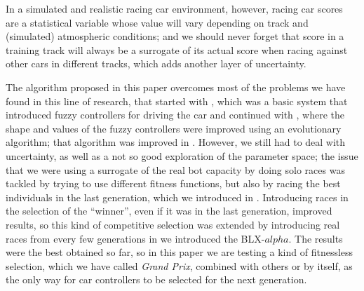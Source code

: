 \documentclass[10pt,journal,compsoc]{IEEEtran}
\begin{document}
\IEEEdisplaynontitleabstractindextext
\IEEEpeerreviewmaketitle





In a simulated and
    realistic racing car environment, however, racing car scores are a
    statistical variable whose value will vary depending on track and
    (simulated) atmospheric conditions; and we should never forget
    that score in a training track will always be a surrogate of its
    actual score when racing against other cars in different tracks,
    which adds another layer of uncertainty.




The algorithm proposed in this paper overcomes most of the problems we
have found in this line of research, that started with
\cite{DBLP:conf/evoW/SalemMMG17}, which was a basic system that
introduced fuzzy controllers for driving the car and continued with
\cite{10.1007/978-3-319-77538-8_24}, where the shape and values of the
fuzzy controllers were improved using an evolutionary algorithm; that
algorithm was improved in \cite{DBLP:conf/ipmu/SalemMGG18}. However,
we still had to deal with uncertainty, as well as a not so good
exploration of the parameter space; the issue that we were using a
surrogate of the real bot capacity by doing solo races was tackled by
trying to use different fitness functions, but also by racing the best
individuals in the last generation, which we introduced in
\cite{salem_cig2018}. Introducing races in the selection of the
``winner'', even if it was in the last generation, improved results,
so this kind of competitive selection was extended by introducing real
races from every few generations in 
\cite{DBLP:conf/cig/SalemMG19} we introduced the BLX-$alpha$. The
results were the best obtained so far, so in this paper we are testing
a kind of fitnessless selection, which we have called \textit{Grand Prix}, combined with others or by itself, as the only way for car controllers to be
selected for the next generation.
\end{document}
